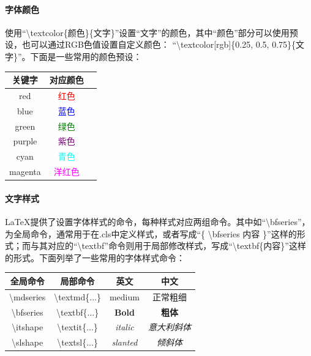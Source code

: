 \documentclass[AutoFakeBold]{ZafuThesis}
\begin{document}
\paragraph{字体颜色} 使用“\textbackslash textcolor\{颜色\}\{文字\}”设置“文字”的颜色，其中“颜色”部分可以使用预设，也可以通过RGB色值设置自定义颜色： “\textbackslash textcolor[rgb]\{0.25, 0.5, 0.75\}\{文字\}”。下面是一些常用的颜色预设：
\begin{table}[htbp]
  \centering
  \begin{tabular}{c c c}
    \toprule[1pt]
    关键字 & 对应颜色\\
    \hline
    red &  \textcolor{red}{红色} \\
    blue &  \textcolor{blue}{蓝色} \\
    green &  \textcolor{green}{绿色} \\
    purple &  \textcolor{purple}{紫色} \\
    cyan &  \textcolor{cyan}{青色} \\
    magenta &  \textcolor{magenta}{洋红色} \\


    \toprule[1pt]
  \end{tabular}
\end{table}
\paragraph{文字样式} \LaTeX 提供了设置字体样式的命令，每种样式对应两组命令。其中如“\textbackslash bfseries”，为全局命令，通常用于在.cls中定义样式，或者写成“\{ \textbackslash bfseries 内容 \}”这样的形式；而与其对应的“\textbackslash textbf”命令则用于局部修改样式，写成“\textbackslash textbf\{内容\}”这样的形式。下面列举了一些常用的字体样式命令：
\begin{table}[htbp]
  \centering
  \begin{tabular}{c c c c}
    \toprule[1pt]
    全局命令 & 局部命令 & 英文 & 中文 \\
    \hline
    \textbackslash mdseries  & \textbackslash textmd\{...\} & \textmd{medium}& \textmd{正常粗细} \\
    \textbackslash bfseries  & \textbackslash textbf\{...\} & \textbf{Bold}& \textbf{粗体} \\
    \textbackslash itshape  & \textbackslash textit\{...\} & \textit{italic}& \textit{意大利斜体} \\
    \textbackslash slshape  & \textbackslash textsl\{...\} & \textsl{slanted}& \textsl{倾斜体} \\
    \toprule[1pt]
  \end{tabular}
\end{table}
\end{document}
